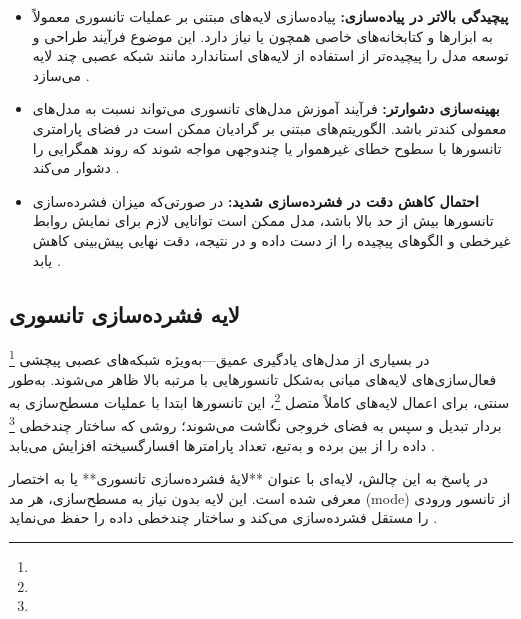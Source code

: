 \begin{itemize}
	\item \textbf{پیچیدگی بالاتر در پیاده‌سازی:} پیاده‌سازی لایه‌های مبتنی بر عملیات تانسوری معمولاً به ابزارها و کتابخانه‌های خاصی همچون  یا  نیاز دارد. این موضوع فرآیند طراحی و توسعه مدل را پیچیده‌تر از استفاده از لایه‌های استاندارد مانند شبکه عصبی چند لایه می‌سازد \cite{kossaifi2017tensorcontraction}.
	
	\item \textbf{بهینه‌سازی دشوارتر:} فرآیند آموزش مدل‌های تانسوری می‌تواند نسبت به مدل‌های معمولی کندتر باشد. الگوریتم‌های مبتنی بر گرادیان ممکن است در فضای پارامتری تانسورها با سطوح خطای غیرهموار یا چندوجهی مواجه شوند که روند همگرایی را دشوار می‌کند \cite{yang2017ttrnn}.
	
	\item \textbf{احتمال کاهش دقت در فشرده‌سازی شدید:} در صورتی‌که میزان فشرده‌سازی تانسورها بیش از حد بالا باشد، مدل ممکن است توانایی لازم برای نمایش روابط غیرخطی و الگوهای پیچیده را از دست داده و در نتیجه، دقت نهایی پیش‌بینی کاهش یابد \cite{kossaifi2020tensorregression}.
\end{itemize}



\subsection{لایه فشرده‌سازی تانسوری}




در بسیاری از مدل‌های یادگیری عمیق—به‌ویژه شبکه‌های عصبی پیچشی 
\footnote{}
 فعال‌سازی‌های لایه‌های میانی به‌شکل تانسورهایی با مرتبه بالا ظاهر می‌شوند. به‌طور سنتی، برای اعمال لایه‌های کاملاً متصل \footnote{}، این تانسورها ابتدا با عملیات مسطح‌سازی  به بردار تبدیل و سپس به فضای خروجی نگاشت می‌شوند؛ روشی که ساختار چندخطی \footnote{} داده را از بین برده و به‌تبع، تعداد پارامترها افسارگسیخته افزایش می‌یابد \cite{kossaifi2020tensorregression}.

در پاسخ به این چالش، لایه‌ای با عنوان **­لایهٔ فشرده‌سازی تانسوری** یا به اختصار  معرفی شده است. این لایه بدون نیاز به مسطح‌سازی، هر مد (mode) از تانسور ورودی را مستقل فشرده‌سازی می‌کند و ساختار چندخطی داده را حفظ می‌نماید \cite{kossaifi2017tensorcontraction,kossaifi2020tensorregression}.



